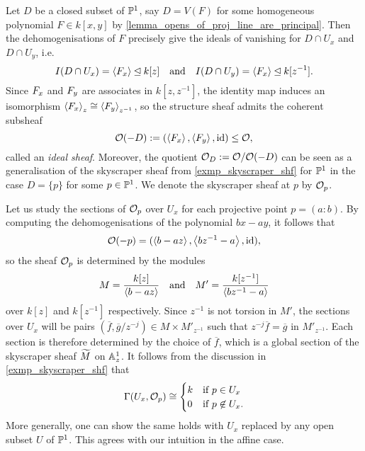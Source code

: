 \begin{example}
  \label{exmp_ideal_sheaf}
  Let $D$ be a closed subset of $\mathbb{P}^{{1}}$, say $D = V(F)$ for some
  homogeneous polynomial $F \in k[x, y]$ by
  \cref{lemma_opens_of_proj_line_are_principal}.
  Then the dehomogenisations of $F$ precisely give the ideals of
  vanishing for $D \cap U_x$ and $D \cap U_y$, i.e.
  \[
    I(D \cap U_x) = \left\langle {{{F}}_{{x}}} \right\rangle \unlhd k[z]
    \quad \text{and} \quad
    I(D \cap U_y) = \left\langle {{{F}}_{{x}}} \right\rangle \unlhd k[z^{-1}].
  \]
  Since ${{F}}_{{x}}$ and ${{F}}_{{y}}$ are associates in $k[z,
  z^{-1}]$, the identity map induces an isomorphism
  $\left\langle {{{F}}_{{x}}} \right\rangle_z \cong \left\langle {{{F}}_{{y}}} \right\rangle_{z^{-1}}$, so
  the structure sheaf admits the coherent subsheaf
  \[
    \mathcal{O}({-D}) := (\left\langle {{{F}}_{{x}}} \right\rangle, \left\langle {{{F}}_{{y}}} \right\rangle, \operatorname{id})
    \leq \mathcal{O},
  \]
  called an \emph{ideal sheaf}.
  Moreover, the quotient $\mathcal{O}_{{D}} :=
  {\mathcal{O}}\mathopen/{\mathcal{O}({-D})}$ can be seen as a generalisation of the
  skyscraper sheaf from \cref{exmp_skyscraper_shf} for $\mathbb{P}^{{1}}$ in
  the case $D = \{p\}$ for some $p \in \mathbb{P}^{{1}}$.
  We denote the skyscraper sheaf at $p$ by $\mathcal{O}_{{p}}$. \noparskip

  Let us study the sections of $\mathcal{O}_{{p}}$ over $U_x$ for each
  projective point $p = (a : b)$.
  By computing the dehomogenisations of the polynomial $bx - ay$, it
  follows that
  \[
    \mathcal{O}({-p}) = (\left\langle {b - az} \right\rangle, \left\langle {bz^{-1} -a} \right\rangle, \operatorname{id}),
  \]
  so the sheaf $\mathcal{O}_{{p}}$ is determined by the modules
  \[
    M = \frac{k[z]}{\left\langle {b - az} \right\rangle}
    \quad \text{and} \quad
    M' = \frac{k[z^{-1}]}{\left\langle {bz^{-1} - a} \right\rangle}
  \]
  over $k[z]$ and $k[z^{-1}]$ respectively.
  Since $z^{-1}$ is not torsion in $M'$, the sections over $U_x$ will
  be pairs $(\overline{f}, \overline{g}/z^{-j}) \in M \times
  M'_{z^{-1}}$ such that $z^{-j} \overline{f} = \overline{g}$ in $M'_{z^{-1}}$.
  Each section is therefore determined by the choice of
  $\overline{f}$, which is a global section of the skyscraper sheaf
  $\widetilde{{M}}$ on $\mathbb{A}^{{1}}_z$.
  It follows from the discussion in \cref{exmp_skyscraper_shf} that
  \[
    \Gamma({U_x}, {\mathcal{O}_{{p}}}) \cong
    \begin{cases}
      k & \text{if } p \in U_x \\
      0 & \text{if } p \not\in U_x.
    \end{cases}
  \]
  More generally, one can show the same holds with $U_x$ replaced by
  any open subset $U$ of $\mathbb{P}^{{1}}$.
  This agrees with our intuition in the affine case.
\end{example}

